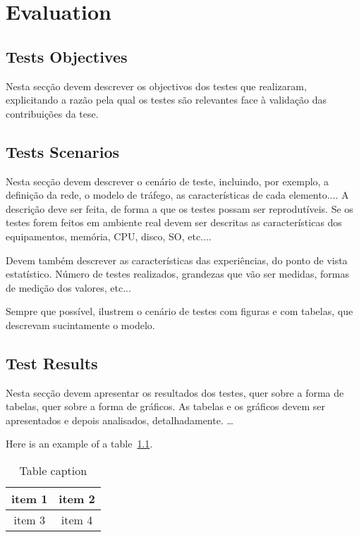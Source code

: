 \chapter{Evaluation}
\label{chapter:evaluation}

\section{Tests Objectives}
Nesta secção devem descrever os objectivos dos testes que realizaram, explicitando
a razão pela qual os testes são relevantes face à validação das contribuições da
tese.

\section{Tests Scenarios}
Nesta secção devem descrever o cenário de teste, incluindo, por exemplo, a
definição da rede, o modelo de tráfego, as características de cada elemento....
A descrição deve ser feita, de forma a que os testes possam ser reprodutíveis.
Se os testes forem feitos em ambiente real devem ser descritas as características
dos equipamentos, memória, CPU, disco, SO, etc....

Devem também descrever as características das experiências, do ponto de vista
estatístico. Número de testes realizados, grandezas que vão ser medidas, formas de
medição dos valores, etc...

Sempre que possível, ilustrem o cenário de testes com figuras e com tabelas, que
descrevam sucintamente o modelo.

\section{Test Results}
Nesta secção devem apresentar os resultados dos testes, quer sobre a forma
de tabelas, quer sobre a forma de gráficos. As tabelas e os gráficos devem ser
apresentados e depois analisados, detalhadamente.
\ldots

Here is an example of a table~\ref{table:simple}.

\begin{table}[!htb]
  \begin{center}
  \caption[Table caption shown in TOC]{Table caption}
    \begin{tabular}{|c|c|}
      \hline
      item 1 & item 2 \\
      \hline
      item 3 & item 4 \\
      \hline
    \end{tabular}
  \end{center}
  \label{table:simple}
\end{table}
